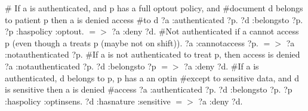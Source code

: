 \documentclass[conference]{IEEEtran}
\begin{document}
\# If a is authenticated, and p has a full optout policy, and \#document d belongs to patient p then a is denied access \newline
\#to d  \newline
\newline
{?a :authenticated ?p. ?d :belongsto ?p. ?p :haspolicy :optout.}  $=>$ {?a :deny ?d}. \newline
\newline
\#Not authenticated if a cannot access p (even though a treats p (maybe not on shift)). \newline
\newline
{?a :cannotaccess ?p.}  $=>$ {?a :notauthenticated ?p}. \newline
\newline
\#If a is not authenticated to treat p, then access is denied \newline
\newline
{?a :notauthenticated ?p. ?d :belongsto ?p}  $=>$ {?a :deny ?d}. \newline
\newline
\#If a is authenticated, d belongs to p, p has a an optin \#except to sensitive data, and d is sensitive then a is denied \newline
\#access \newline
\newline
{?a :authenticated ?p. ?d :belongsto ?p. ?p :haspolicy :optinsens. ?d :hasnature :sensitive}  $=>$ {?a :deny ?d}. \newline



\end{document}
